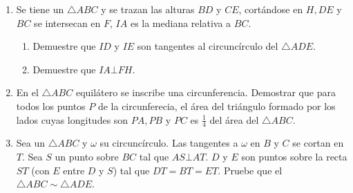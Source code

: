 \documentclass{book}
\begin{document}
\begin{enumerate}
    \item Se tiene un $\triangle ABC$ y se trazan las alturas $BD$ y $CE$, cortándose en $H,DE$ y $BC$ se intersecan en $F$, $IA$ es la mediana relativa a $BC$.
          \begin{enumerate}
              \item Demuestre que $ID$ y $IE$ son tangentes al circuncírculo del $\triangle ADE$.
              \item Demuestre que $IA \bot FH$.
          \end{enumerate}
    \item En el $\triangle ABC$ equilátero se inscribe una circunferencia. Demostrar que para todos los puntos $P$ de la circunferecia, el área del triángulo formado por los lados cuyas longitudes son $PA, PB$ y $PC$ es $\displaystyle{\frac{1}{4}}$ del área del $\triangle ABC$.
    \item Sea un $\triangle ABC$ y $\omega$ su circuncírculo. Las tangentes a $\omega$ en $B$ y $C$ se cortan en $T$. Sea $S$ un punto sobre $BC$ tal que $AS \bot AT$. $D$ y $E$ son puntos sobre la recta $ST$ (con $E$ entre $D$ y $S$) tal que $DT = BT =ET$. Pruebe que el $\triangle ABC\sim\triangle ADE$.
\end{enumerate}
\newpage
\end{document}
